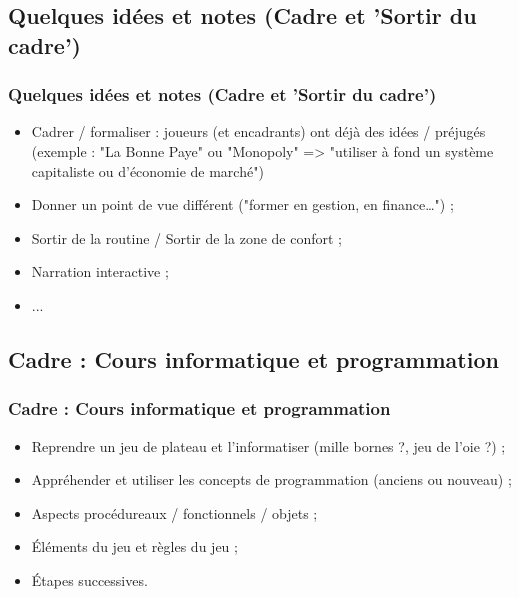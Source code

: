 \documentclass[slidetop,11pt]{beamer}
\begin{document}
\subsection{Quelques id{\'e}es et notes (Cadre et 'Sortir du cadre')}
\begin{frame}
	\frametitle{Quelques id{\'e}es et notes (Cadre et 'Sortir du cadre')}
	\begin{itemize}
		\item Cadrer / formaliser : joueurs (et encadrants) ont d{\'e}j{\`a} des id{\'e}es / pr{\'e}jug{\'e}s (exemple : "La Bonne Paye" ou "Monopoly" => "utiliser {\`a} fond un syst{\`e}me capitaliste ou d'{\'e}conomie de march{\'e}")
		\item Donner un point de vue diff{\'e}rent ("former en gestion, en finance\ldots") ; 
		\item Sortir de la routine / Sortir de la zone de confort ; 
		\item Narration interactive ; 
		\item ...
	\end{itemize}
\end{frame} 

\subsection{Cadre : Cours informatique et programmation}
\begin{frame}
	\frametitle{Cadre : Cours informatique et programmation}
	\begin{itemize}
		\item Reprendre un jeu de plateau et l'informatiser (mille bornes ?, jeu de l'oie ?) ; 
		\item Appr{\'e}hender et utiliser les concepts de programmation (anciens ou nouveau) ; 
		\item Aspects proc{\'e}dureaux / fonctionnels / objets ; 
		\item {\'E}l{\'e}ments du jeu et r{\`e}gles du jeu ; 
		\item {\'E}tapes successives. 
	\end{itemize}
\end{frame}
\end{document}
